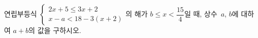 연립부등식 $\begin{cases} 2x+5\le 3x+2 \\ x-a<18-3(x+2) \end{cases}$의 해가 $b\le x<\dfrac{15}{4}$일 때, 상수~$a$, $b$에 대하여 $a+b$의 값을 구하시오.
